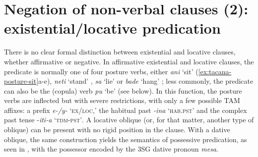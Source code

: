 \documentclass[output=paper,draft,draftmode,colorlinks,citecolor=brown]{langscibook}
\begin{document}
\section{Negation of non-verbal clauses (2): existential\slash locative predication}\label{sec:tacana-5}

There is no clear formal distinction between existential and locative
clauses, whether affirmative or negative. In affirmative existential and
locative clauses, the predicate is normally one of four posture verbs,
either \textit{ani} `sit' (\ref{ex:tacana-posture-sit}a-e), \textit{neti}
`stand' , \textit{sa} `lie'
 or \textit{bade} `hang'
; less commonly, the predicate can also be the
(copula) verb \textit{pu} `be' (see below). In this function, the posture
verbs are inflected but with severe restrictions, with only a few possible
TAM affixes: a prefix \textit{e-/y-} `\textsc{ex\slash loc},' the habitual
past \textit{-ina} `\textsc{hab.pst}' and the complex past tense
-\textit{iti-a} `\textsc{tdm-pst'}. A locative oblique (or, for that
matter, another type of oblique) can be present with no rigid position in
the clause. With a dative oblique, the same construction yields the
semantics of possessive predication, as seen in
, with the possessor encoded by the 3SG dative pronoun \textit{mesa}.
\end{document}
